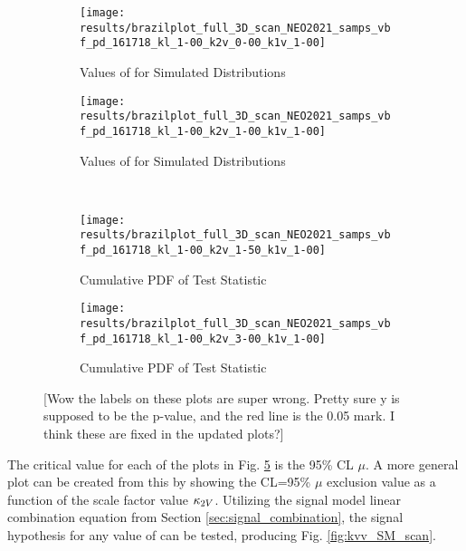     \begin{figure}
        \centering
        \begin{subfigure}{0.48\textwidth} 
            \texttt{[image: results/brazilplot\_full\_3D\_scan\_NEO2021\_samps\_vbf\_pd\_161718\_kl\_1-00\_k2v\_0-00\_k1v\_1-00]}
            \caption{Values of \qtil for Simulated Distributions}
            \label{fig:mu_CL_k2v0}
        \end{subfigure}
        \begin{subfigure}{0.48\textwidth} 
            \texttt{[image: results/brazilplot\_full\_3D\_scan\_NEO2021\_samps\_vbf\_pd\_161718\_kl\_1-00\_k2v\_1-00\_k1v\_1-00]}
            \caption{Values of \qtil for Simulated Distributions}
            \label{fig:mu_CL_k2v1}
        \end{subfigure} \\
        \begin{subfigure}{0.48\textwidth}
            \texttt{[image: results/brazilplot\_full\_3D\_scan\_NEO2021\_samps\_vbf\_pd\_161718\_kl\_1-00\_k2v\_1-50\_k1v\_1-00]}
            \caption{Cumulative PDF of \qtil Test Statistic}
            \label{fig:mu_CL_k2v1.5}
        \end{subfigure}
        \begin{subfigure}{0.48\textwidth}
            \texttt{[image: results/brazilplot\_full\_3D\_scan\_NEO2021\_samps\_vbf\_pd\_161718\_kl\_1-00\_k2v\_3-00\_k1v\_1-00]}
            \caption{Cumulative PDF of \qtil Test Statistic}
            \label{fig:mu_CL_k2v3}
        \end{subfigure}
        \caption{
            [Wow the labels on these plots are super wrong. Pretty sure y is supposed to be the p-value,
                and the red line is the 0.05 mark. I think these are fixed in the updated plots?]
        }\label{fig:mu_CL_vals}
    \end{figure}

    \FloatBarrier
    The critical value for each of the plots in Fig. \ref{fig:mu_CL_vals} is the 95\% CL $\mu$.
    A more general plot can be created from this by showing the CL=95\% $\mu$
        exclusion value as a function of the scale factor value $\kappa_{2V}$.
    Utilizing the signal model linear combination equation from Section \ref{sec:signal_combination},
        the signal hypothesis for any value of \kvv can be tested, producing Fig. \ref{fig:kvv_SM_scan}.

